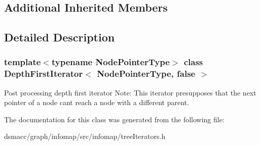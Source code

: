 \subsection*{Additional Inherited Members}


\subsection{Detailed Description}
\subsubsection*{template$<$typename Node\+Pointer\+Type$>$\newline
class Depth\+First\+Iterator$<$ Node\+Pointer\+Type, false $>$}

Post processing depth first iterator Note\+: This iterator presupposes that the next pointer of a node can\textquotesingle{}t reach a node with a different parent. 

The documentation for this class was generated from the following file\+:\begin{DoxyCompactItemize}
\item 
dsmacc/graph/infomap/src/infomap/tree\+Iterators.\+h\end{DoxyCompactItemize}
